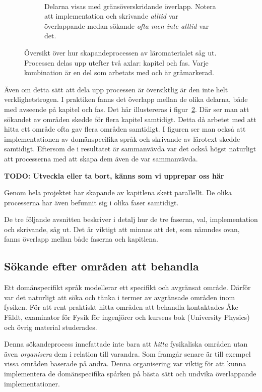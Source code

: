 \begin{draft}
\begin{figure}[tph]
\begin{subfigure}[t]{0.5\textwidth}
        \caption{Delarna visas med gränsöverskridande överlapp. Notera att
        implementation och skrivande \textit{alltid} var överlappande medan
      sökande \textit{ofta men inte alltid} var det.}~\label{fig:oversiktB}
    \end{subfigure}
    \caption{Översikt över hur skapandeprocessen av läromaterialet såg ut.
  Processen delas upp utefter två axlar: kapitel och fas. Varje kombination
  är en del som arbetats med och är gråmarkerad.} 
\end{figure}

Även om detta sätt att dela upp processen är översiktlig är den inte helt
verklighetstrogen. I praktiken fanns det överlapp mellan de olika delarna, både
med avseende på kapitel och fas. Det här illustereras i
figur~\ref{fig:oversiktB}. Där ser man att sökandet av områden skedde för flera
kapitel samtidigt. Detta då arbetet med att hitta ett område ofta gav flera
områden samtidigt. I figuren ser man också att implementationen av domänspecifika
språk och skrivande av lärotext skedde samtidigt. Eftersom de i resultatet är
sammanvävda var det också högst naturligt att processerna med att skapa dem
även de var sammanvävda.

\begin{binge}
\textbf{TODO: Utveckla eller ta bort, känns som vi upprepar oss här}

Genom hela projektet har skapande av kapitlena skett parallellt. De olika
processerna har även befunnit sig i olika faser samtidigt.
\end{binge}

De tre följande avsnitten beskriver i detalj hur de tre faserna, val,
implementation och skrivande, såg ut. Det är viktigt att minnas att det, som
nämndes ovan, fanns överlapp mellan både faserna och kapitlena.

\subsection{Sökande efter områden att behandla}\label{sec:valet}

Ett domänspecifikt språk modellerar ett specifikt och avgränsat område. Därför
var det naturligt att söka och tänka i termer av avgränsade områden inom
fysiken. För att rent praktiskt hitta områden att behandla kontaktades Åke
Fäldt, examinator för Fysik för ingenjörer\cite{tif085} och kursens bok (University
Physics\cite{UP}) och övrig material studerades.

Denna sökandeprocess innefattade inte bara att \textit{hitta} fysikaliska
områden utan även \textit{organisera} dem i relation till varandra. Som framgår
senare är till exempel vissa områden baserade på andra. Denna organisering
var viktig för att kunna implementera de domänspecifika spårken på bästa sätt
och undvika överlappande implementationer.


\end{draft}
